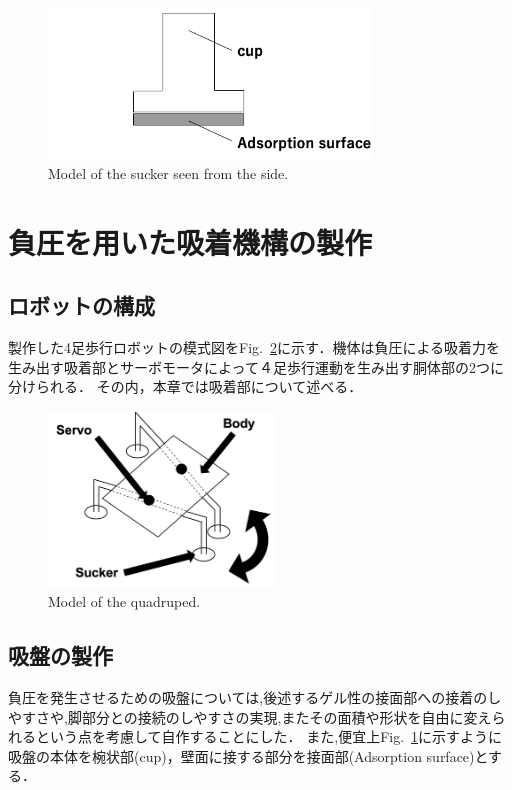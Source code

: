 \documentclass[uplatex,dvipdfmx]{jlreq}
\begin{document}
\begin{figure}[t]
    \centering
    \includegraphics[height=40mm,]{./figure/sideview_sucker.png}
    \caption{Model of the sucker seen from the side.}
    \label{fig:model_sucker}
\end{figure}

\section{負圧を用いた吸着機構の製作}
\subsection{ロボットの構成}
製作した4足歩行ロボットの模式図をFig.~\ref{fig:model_of_the_quadruped}に示す．機体は負圧による吸着力を生み出す吸着部とサーボモータによって４足歩行運動を生み出す胴体部の2つに分けられる．
その内，本章では吸着部について述べる．

\begin{figure}
    \centering
    \includegraphics[width=60mm]{./figure/overview_model.png}
    \caption{Model of the quadruped.}
    \label{fig:model_of_the_quadruped}
\end{figure}

\subsection{吸盤の製作}
負圧を発生させるための吸盤については,後述するゲル性の接面部への接着のしやすさや,脚部分との接続のしやすさの実現,またその面積や形状を自由に変えられるという点を考慮して自作することにした．
また,便宜上Fig.~\ref{fig:model_sucker}に示すように吸盤の本体を椀状部(cup)，壁面に接する部分を接面部(Adsorption surface)とする．
\end{document}
